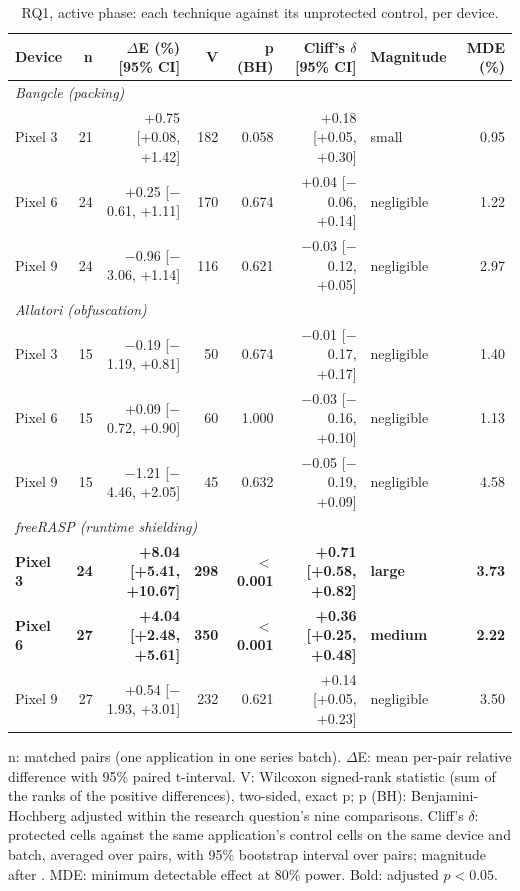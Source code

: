 \begin{table}[t]
\centering
\small
\caption{RQ1, active phase: each technique against its unprotected control, per device.}
\label{tab:rq1}
\begin{tabular}{lrrrrrlr}
\toprule
\textbf{Device} & \textbf{n} & \textbf{$\Delta$E (\%) [95\% CI]} & \textbf{V} & \textbf{p (BH)} & \textbf{Cliff's $\delta$ [95\% CI]} & \textbf{Magnitude} & \textbf{MDE (\%)} \\
\midrule
\multicolumn{8}{l}{\textit{Bangcle (packing)}} \\
Pixel 3 & 21 & +0.75 [+0.08, +1.42] & 182 & 0.058 & +0.18 [+0.05, +0.30] & small & 0.95 \\
Pixel 6 & 24 & +0.25 [$-$0.61, +1.11] & 170 & 0.674 & +0.04 [$-$0.06, +0.14] & negligible & 1.22 \\
Pixel 9 & 24 & $-$0.96 [$-$3.06, +1.14] & 116 & 0.621 & $-$0.03 [$-$0.12, +0.05] & negligible & 2.97 \\
\midrule
\multicolumn{8}{l}{\textit{Allatori (obfuscation)}} \\
Pixel 3 & 15 & $-$0.19 [$-$1.19, +0.81] & 50 & 0.674 & $-$0.01 [$-$0.17, +0.17] & negligible & 1.40 \\
Pixel 6 & 15 & +0.09 [$-$0.72, +0.90] & 60 & 1.000 & $-$0.03 [$-$0.16, +0.10] & negligible & 1.13 \\
Pixel 9 & 15 & $-$1.21 [$-$4.46, +2.05] & 45 & 0.632 & $-$0.05 [$-$0.19, +0.09] & negligible & 4.58 \\
\midrule
\multicolumn{8}{l}{\textit{freeRASP (runtime shielding)}} \\
\textbf{Pixel 3} & \textbf{24} & \textbf{+8.04 [+5.41, +10.67]} & \textbf{298} & \textbf{$<$ 0.001} & \textbf{+0.71 [+0.58, +0.82]} & \textbf{large} & \textbf{3.73} \\
\textbf{Pixel 6} & \textbf{27} & \textbf{+4.04 [+2.48, +5.61]} & \textbf{350} & \textbf{$<$ 0.001} & \textbf{+0.36 [+0.25, +0.48]} & \textbf{medium} & \textbf{2.22} \\
Pixel 9 & 27 & +0.54 [$-$1.93, +3.01] & 232 & 0.621 & +0.14 [+0.05, +0.23] & negligible & 3.50 \\
\bottomrule
\end{tabular}
\par\smallskip\footnotesize n: matched pairs (one application in one series batch). $\Delta$E: mean per-pair relative difference with 95\% paired t-interval. V: Wilcoxon signed-rank statistic (sum of the ranks of the positive differences), two-sided, exact p; p (BH): Benjamini-Hochberg adjusted within the research question's nine comparisons. Cliff's $\delta$: protected cells against the same application's control cells on the same device and batch, averaged over pairs, with 95\% bootstrap interval over pairs; magnitude after \cite{romano2006cliff}. MDE: minimum detectable effect at 80\% power. Bold: adjusted $p < 0.05$.
\end{table}
